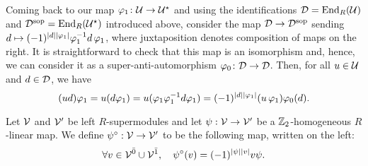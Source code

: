 


Coming back to our map $\varphi_1\colon \mathcal U \to \mathcal U^\star$ and using the identifications $\mathcal{D} = \operatorname{End}_R(\mathcal U)$ and $\mathcal{D}^{\mathrm{sop}} = \operatorname{End}_R(\mathcal U^\star)$ introduced above, consider the map $\mathcal{D} \to \mathcal{D}^{\mathrm{sop}}$ sending $d \mapsto (-1)^{|d||\varphi_1|}\varphi_1^{-1} d \,\varphi_1$, where juxtaposition denotes composition of maps on the right.
It is straightforward to check that this map is an isomorphism and, hence, we can consider it as a super-anti-automorphism $\varphi_0 \colon \mathcal{D} \to \mathcal{D}$.
Then, for all $u\in \mathcal U$ and $d\in \mathcal{D}$, we have
%
\begin{equation}\label{eq:sesquilinear-before-B}
	(ud)\varphi_1 = u (d\varphi_1) =  u(\varphi_1\varphi_1^{-1} d \varphi_1) = (-1)^{|d||\varphi_1|}(u\,\varphi_1 )\varphi_0(d).
\end{equation}


\begin{defi}\label{def:change-map-to-the-left}
	Let $\mathcal V$ and $\mathcal V'$ be left $R$-supermodules and let $\psi: \mathcal V \to \mathcal V'$ be a $\mathbb{Z}_2$-homogeneous $R$-linear map. 
	We define $\psi^\circ: \mathcal V \to  \mathcal V'$ to be the following map, written on the left:
	\[
		\forall v\in \mathcal V^{\bar0} \cup \mathcal V^{\bar1}, \quad \psi^\circ(v) = (-1)^{|\psi||v|} v\psi.
	\]
\end{defi}

